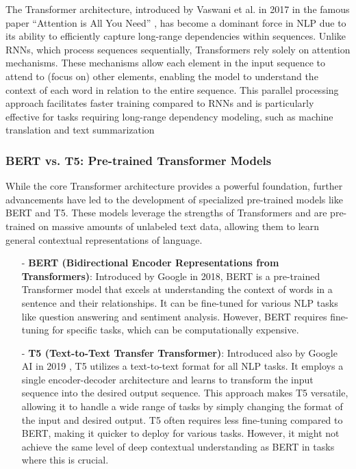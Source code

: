 \documentclass[15pt]{article}
\begin{document}
The Transformer architecture, introduced by Vaswani et al. in 2017 in the famous paper “Attention is All You Need” \cite{Vaswani2017}, has become a dominant force in NLP due to its ability to efficiently capture long-range dependencies within sequences. Unlike RNNs, which process sequences sequentially, Transformers rely solely on attention mechanisms. These mechanisms allow each element in the input sequence to attend to (focus on) other elements, enabling the model to understand the context of each word in relation to the entire sequence. This parallel processing approach facilitates faster training compared to RNNs and is particularly effective for tasks requiring long-range dependency modeling, such as machine translation and text summarization

\subsubsection{BERT vs. T5: Pre-trained Transformer Models}

While the core Transformer architecture provides a powerful foundation, further advancements have led to the development of specialized pre-trained models like BERT and T5. These models leverage the strengths of Transformers and are pre-trained on massive amounts of unlabeled text data, allowing them to learn general contextual representations of language.

\begin{enumerate}
    \item[-] \textbf{BERT (Bidirectional Encoder Representations from Transformers)}: Introduced by Google \cite{devlin2018} in 2018, BERT is a pre-trained Transformer model that excels at understanding the context of words in a sentence and their relationships. It can be fine-tuned for various NLP tasks like question answering and sentiment analysis. However, BERT requires fine-tuning for specific tasks, which can be computationally expensive.
    \item[-] \textbf{T5 (Text-to-Text Transfer Transformer)}: Introduced also by Google AI in 2019 \cite{Raffel2019}, T5 utilizes a text-to-text format for all NLP tasks. It employs a single encoder-decoder architecture and learns to transform the input sequence into the desired output sequence. This approach makes T5 versatile, allowing it to handle a wide range of tasks by simply changing the format of the input and desired output. T5 often requires less fine-tuning compared to BERT, making it quicker to deploy for various tasks. However, it might not achieve the same level of deep contextual understanding as BERT in tasks where this is crucial.
\end{enumerate}
\end{document}
